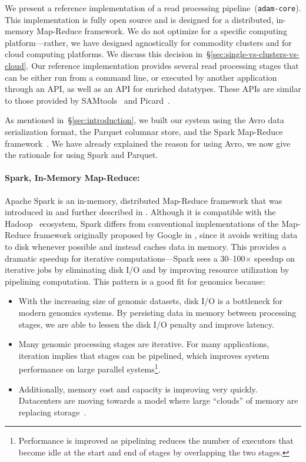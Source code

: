 \documentclass{bioinfo}
\begin{document}
We present a reference implementation of a read processing pipeline~(\texttt{adam-core}). This implementation is fully open source
and is designed for a distributed, in-memory Map-Reduce framework. We do not optimize for a specific computing platform---rather, we have designed
agnostically for commodity clusters and for cloud computing platforms. We discuss this decision in~\S\ref{sec:single-vs-clusters-vs-cloud}. Our reference
implementation provides several read processing stages that can be either run from a command line, or executed by another application through
an API, as well as an API for enriched datatypes. These APIs are similar to those provided by SAMtools~\citep{li09} and Picard~\citep{picard}.

As mentioned in~\S\ref{sec:introduction}, we built our system using the Avro data serialization format, the Parquet columnar store, and the Spark Map-Reduce
framework~\citep{avro, parquet, zaharia10}. We have already explained the reason for using Avro, we now give the rationale for using Spark and Parquet.

\paragraph{Spark, In-Memory Map-Reduce:}
\label{sec:spark}

Apache Spark is an in-memory, distributed Map-Reduce framework that was introduced in \citet{zaharia10} and further described in \citet{zaharia12}.
Although it is compatible with the Hadoop~\citep{hadoop} ecosystem, Spark differs from conventional implementations of the Map-Reduce framework
originally proposed by Google in \citet{dean08}, since it avoids writing data to disk whenever possible and instead caches
data in memory. This provides a dramatic speedup for iterative computations---Spark sees a 30--100$\times$ speedup on iterative jobs by eliminating
disk I/O and by improving resource utilization by pipelining computation. This pattern is a good fit for genomics because:

\begin{itemize}
\item With the increasing size of genomic datasets, disk I/O is a bottleneck for modern genomics systems. By persisting data in memory between processing stages,
we are able to lessen the disk I/O penalty and improve latency.
\item Many genomic processing stages are iterative. For many applications, iteration implies that stages can be pipelined, which improves system performance on large
parallel systems\footnote{Performance is improved as pipelining reduces the number of executors that become idle at the start and end of stages by overlapping the
two stages.}.
\item Additionally, memory cost and capacity is improving very quickly. Datacenters are moving towards a model where large ``clouds'' of memory are replacing
storage~\citep{barroso13}.
\end{itemize}
\end{document}
